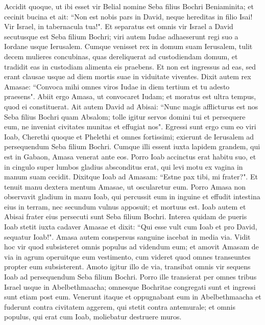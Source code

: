 \begin{biblechapter}  
\verse Accidit quoque, ut ibi esset vir Belial nomine Seba filius Bochri Beniaminita; et cecinit bucina et ait: “Non est nobis pars in David, neque hereditas in filio Isai! Vir Israel, in tabernacula tua!". 
\verse Et separatus est omnis vir Israel a David secutusque est Seba filium Bochri; viri autem Iudae adhaeserunt regi suo a Iordane usque Ierusalem. 
\verse Cumque venisset rex in domum suam Ierusalem, tulit decem mulieres concubinas, quas dereliquerat ad custodiendam domum, et tradidit eas in custodiam alimenta eis praebens. Et non est ingressus ad eas, sed erant clausae usque ad diem mortis suae in viduitate viventes. 
\verse Dixit autem rex Amasae: “Convoca mihi omnes viros Iudae in diem tertium et tu adesto praesens". 
\verse Abiit ergo Amasa, ut convocaret Iudam; et moratus est ultra tempus, quod ei constituerat. 
\verse Ait autem David ad Abisai: “Nunc magis afflicturus est nos Seba filius Bochri quam Absalom; tolle igitur servos domini tui et persequere eum, ne inveniat civitates munitas et effugiat nos".  
\verse Egressi sunt ergo cum eo viri Ioab, Cherethi quoque et Phelethi et omnes fortissimi; exierunt de Ierusalem ad persequendum Seba filium Bochri. 
\verse Cumque illi essent iuxta lapidem grandem, qui est in Gabaon, Amasa venerat ante eos. Porro Ioab accinctus erat habitu suo, et in cingulo super lumbos gladius absconditus erat, qui levi motu ex vagina in manum suam cecidit. 
\verse Dixitque Ioab ad Amasam: “Estne pax tibi, mi frater?". Et tenuit manu dextera mentum Amasae, ut oscularetur eum. 
\verse Porro Amasa non observavit gladium in manu Ioab, qui percussit eum in inguine et effudit intestina eius in terram, nec secundum vulnus apposuit; et mortuus est. Ioab autem et Abisai frater eius persecuti sunt Seba filium Bochri. 
\verse Interea quidam de pueris Ioab stetit iuxta cadaver Amasae et dixit: “Qui esse vult cum Ioab et pro David, sequatur Ioab!". 
\verse Amasa autem conspersus sanguine iacebat in media via. Vidit hoc vir quod subsisteret omnis populus ad videndum eum; et amovit Amasam de via in agrum operuitque eum vestimento, cum videret quod omnes transeuntes propter eum subsisterent. 
\verse Amoto igitur illo de via, transibat omnis vir sequens Ioab ad persequendum Seba filium Bochri. 
\verse Porro ille transierat per omnes tribus Israel usque in Abelbethmaacha; omnesque Bochritae congregati sunt et ingressi sunt etiam post eum. 
\verse Venerunt itaque et oppugnabant eum in Abelbethmaacha et fuderunt contra civitatem aggerem, qui stetit contra antemurale; et omnis populus, qui erat cum Ioab, moliebatur destruere muros. 

\end{biblechapter}
